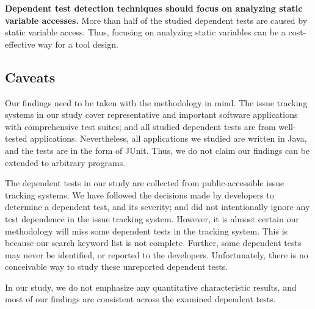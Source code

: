 \vspace{1mm}
\noindent \textbf{Dependent test detection techniques
should focus on analyzing static variable accesses.}
More than half of the studied dependent tests are caused
by static variable access. Thus, focusing on analyzing
static variables can be a cost-effective way for a
tool design. 





\subsection{Caveats}

Our findings need to be taken with the methodology in mind. The
issue tracking systems in our study cover representative and important
software applications with comprehensive test suites; and
all studied dependent tests are from well-tested
applications. Nevertheless, all applications we studied
are written in Java, and the tests are in the form of JUnit.
Thus, we do not claim our findings can be extended to
arbitrary programs.

The dependent tests in our study are collected from public-accessible
issue tracking systems. We have followed the decisions made by
developers to determine a dependent test, and its severity;
and did not intentionally ignore
any test dependence in the issue tracking system. However,
it is almost certain our methodology will miss
some dependent tests in the tracking system. This is
because our search keyword list is not complete. Further,
some dependent tests may never
be identified, or reported to the developers. Unfortunately,
there is no conceivable way to study these unreported
dependent tests. 


In our study, we do not emphasize any quantitative characteristic
results, and most of our findings are consistent across
the examined dependent tests.

